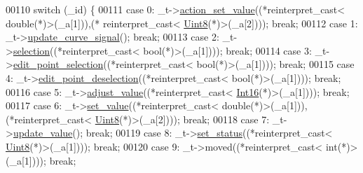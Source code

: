 \begin{DoxyCode}
00110         \textcolor{keywordflow}{switch} (\_id) \{
00111         \textcolor{keywordflow}{case} 0: \_t->\hyperlink{a00024_a886f07f2c612121bec703581f9398a10}{action\_set\_value}((*\textcolor{keyword}{reinterpret\_cast<} \textcolor{keywordtype}{double}(*)\textcolor{keyword}{>}(\_a[1])),(*\textcolor{keyword}{
      reinterpret\_cast<} \hyperlink{a00001_a979e3e23b9a449e69ab6a8a83b6042f8}{Uint8}(*)\textcolor{keyword}{>}(\_a[2]))); \textcolor{keywordflow}{break};
00112         \textcolor{keywordflow}{case} 1: \_t->\hyperlink{a00024_a49696761b5c638a3b2d58b16af9773e0}{update\_curve\_signal}(); \textcolor{keywordflow}{break};
00113         \textcolor{keywordflow}{case} 2: \_t->\hyperlink{a00024_a66bf875d43a16cf37527ab75c439fd8e}{selection}((*\textcolor{keyword}{reinterpret\_cast<} \textcolor{keywordtype}{bool}(*)\textcolor{keyword}{>}(\_a[1]))); \textcolor{keywordflow}{break};
00114         \textcolor{keywordflow}{case} 3: \_t->\hyperlink{a00024_adeebaace74ff3add2acd9147e96fc0a6}{edit\_point\_selection}((*\textcolor{keyword}{reinterpret\_cast<} \textcolor{keywordtype}{bool}(*)\textcolor{keyword}{>}(\_a[1]))); \textcolor{keywordflow}{break};
00115         \textcolor{keywordflow}{case} 4: \_t->\hyperlink{a00024_a105dff1f3ae7cfdcfabacd013428a501}{edit\_point\_deselection}((*\textcolor{keyword}{reinterpret\_cast<} \textcolor{keywordtype}{bool}(*)\textcolor{keyword}{>}(\_a[1]))); \textcolor{keywordflow}{
      break};
00116         \textcolor{keywordflow}{case} 5: \_t->\hyperlink{a00024_a521ac5143857dd652a0bafa77389fa81}{adjust\_value}((*\textcolor{keyword}{reinterpret\_cast<} \hyperlink{a00001_a3985266aecb120f269789241c170850c}{Int16}(*)\textcolor{keyword}{>}(\_a[1]))); \textcolor{keywordflow}{break};
00117         \textcolor{keywordflow}{case} 6: \_t->\hyperlink{a00024_ae3010d3de02715db2f443560d7d2a27b}{set\_value}((*\textcolor{keyword}{reinterpret\_cast<} \textcolor{keywordtype}{double}(*)\textcolor{keyword}{>}(\_a[1])),(*\textcolor{keyword}{reinterpret\_cast<} 
      \hyperlink{a00001_a979e3e23b9a449e69ab6a8a83b6042f8}{Uint8}(*)\textcolor{keyword}{>}(\_a[2]))); \textcolor{keywordflow}{break};
00118         \textcolor{keywordflow}{case} 7: \_t->\hyperlink{a00024_a4f62a01554ee8d975abe0cb136937695}{update\_value}(); \textcolor{keywordflow}{break};
00119         \textcolor{keywordflow}{case} 8: \_t->\hyperlink{a00024_a567902754e43310fe921b74c9d1862dd}{set\_status}((*\textcolor{keyword}{reinterpret\_cast<} \hyperlink{a00001_a979e3e23b9a449e69ab6a8a83b6042f8}{Uint8}(*)\textcolor{keyword}{>}(\_a[1]))); \textcolor{keywordflow}{break};
00120         \textcolor{keywordflow}{case} 9: \_t->moved((*\textcolor{keyword}{reinterpret\_cast<} \textcolor{keywordtype}{int}(*)\textcolor{keyword}{>}(\_a[1]))); \textcolor{keywordflow}{break};

\end{DoxyCode}
